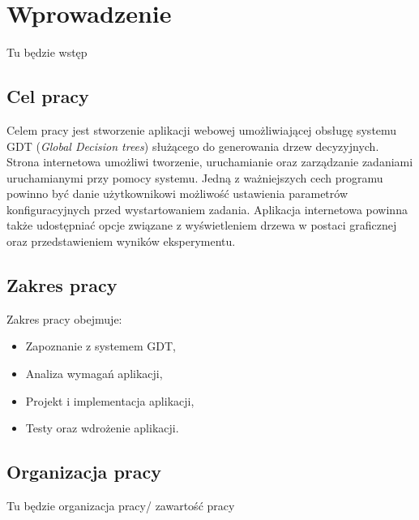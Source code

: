 \chapter*{Wprowadzenie}
Tu będzie wstęp

\section*{Cel pracy}
Celem pracy jest stworzenie aplikacji webowej umożliwiającej obsługę systemu GDT (\textit{Global Decision trees}) służącego do generowania drzew decyzyjnych. Strona internetowa umożliwi tworzenie, uruchamianie oraz zarządzanie zadaniami uruchamianymi przy pomocy systemu. Jedną z ważniejszych cech programu powinno być danie użytkownikowi możliwość ustawienia parametrów konfiguracyjnych przed wystartowaniem zadania. Aplikacja internetowa powinna także udostępniać opcje związane z wyświetleniem drzewa w postaci graficznej oraz przedstawieniem wyników eksperymentu.
\section*{Zakres pracy}
Zakres pracy obejmuje: 

\begin{itemize}
\item Zapoznanie z systemem GDT,
\item Analiza wymagań aplikacji,
\item Projekt i implementacja aplikacji, 
\item Testy oraz wdrożenie aplikacji.
\end{itemize}


\section*{Organizacja pracy}
Tu będzie organizacja pracy/ zawartość pracy  
